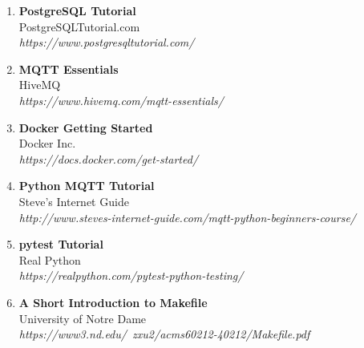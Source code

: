 \begin{enumerate}

    \item \textbf{PostgreSQL Tutorial} \\
    PostgreSQLTutorial.com \\
    \textit{https://www.postgresqltutorial.com/}

    \item \textbf{MQTT Essentials} \\
    HiveMQ \\
    \textit{https://www.hivemq.com/mqtt-essentials/}

    \item \textbf{Docker Getting Started} \\
    Docker Inc. \\
    \textit{https://docs.docker.com/get-started/}

    \item \textbf{Python MQTT Tutorial} \\
    Steve's Internet Guide \\
    \textit{http://www.steves-internet-guide.com/mqtt-python-beginners-course/}

    \item \textbf{pytest Tutorial} \\
    Real Python \\
    \textit{https://realpython.com/pytest-python-testing/}

    \item \textbf{A Short Introduction to Makefile} \\
    University of Notre Dame \\
    \textit{https://www3.nd.edu/~zxu2/acms60212-40212/Makefile.pdf}

\end{enumerate}